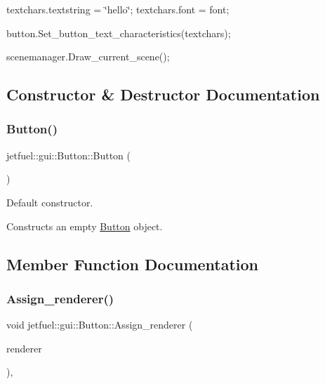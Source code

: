 textchars.\+textstring = \char`\"{}hello\char`\"{}; textchars.\+font = font;

button.\+Set\+\_\+button\+\_\+text\+\_\+characteristics(textchars);

scenemanager.\+Draw\+\_\+current\+\_\+scene(); 

\subsection{Constructor \& Destructor Documentation}
\mbox{\label{classjetfuel_1_1gui_1_1Button_ad9fc0a1426f1fe03563ebac1c4ffcd92}} 
\subsubsection{\texorpdfstring{Button()}{Button()}}
{\footnotesize\ttfamily jetfuel\+::gui\+::\+Button\+::\+Button (\begin{DoxyParamCaption}{ }\end{DoxyParamCaption})\hspace{0.3cm}{\ttfamily [inline]}}



Default constructor. 

Constructs an empty \hyperlink{classjetfuel_1_1gui_1_1Button}{Button} object. 

\subsection{Member Function Documentation}
\mbox{\label{classjetfuel_1_1gui_1_1Button_aa566a1d59623fde8d062c3d02b6fd5f4}} 
\subsubsection{\texorpdfstring{Assign\+\_\+renderer()}{Assign\_renderer()}}
{\footnotesize\ttfamily void jetfuel\+::gui\+::\+Button\+::\+Assign\+\_\+renderer (\begin{DoxyParamCaption}\item[{S\+D\+L\+\_\+\+Renderer $\ast$}]{renderer }\end{DoxyParamCaption})\hspace{0.3cm}{\ttfamily [override]}, {\ttfamily [virtual]}}



